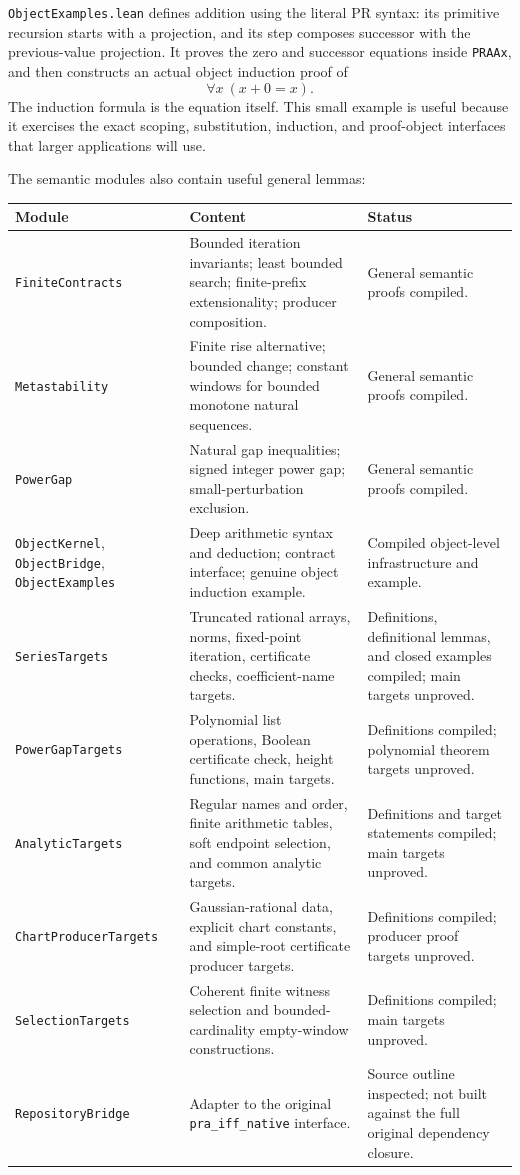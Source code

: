 \texttt{ObjectExamples.lean} defines addition using the literal PR syntax:
its primitive recursion starts with a projection, and its step composes
successor with the previous-value projection.  It proves the zero and
successor equations inside \texttt{PRAAx}, and then constructs an actual
object induction proof of
\[
                         \forall x\ (x+0=x).
\]
The induction formula is the equation itself.  This small example is
useful because it exercises the exact scoping, substitution, induction,
and proof-object interfaces that larger applications will use.

The semantic modules also contain useful general lemmas:
\begin{center}\small
\begin{longtable}{@{}P{.27\linewidth}P{.36\linewidth}P{.28\linewidth}@{}}
\toprule
Module & Content & Status\\
\midrule\endhead
\texttt{FiniteContracts} & Bounded iteration invariants; least bounded
search; finite-prefix extensionality; producer composition. & General
semantic proofs compiled.\\
\texttt{Metastability} & Finite rise alternative; bounded change;
constant windows for bounded monotone natural sequences. & General
semantic proofs compiled.\\
\texttt{PowerGap} & Natural gap inequalities; signed integer power gap;
small-perturbation exclusion. & General semantic proofs compiled.\\
\texttt{ObjectKernel}, \texttt{ObjectBridge}, \texttt{ObjectExamples}
& Deep arithmetic syntax and deduction; contract interface; genuine
object induction example. & Compiled object-level infrastructure and
example.\\
\texttt{SeriesTargets} & Truncated rational arrays, norms, fixed-point
iteration, certificate checks, coefficient-name targets. & Definitions,
definitional lemmas, and closed examples compiled; main targets unproved.\\
\texttt{PowerGapTargets} & Polynomial list operations, Boolean certificate
check, height functions, main targets. & Definitions compiled; polynomial
theorem targets unproved.\\
\texttt{AnalyticTargets} & Regular names and order, finite arithmetic
tables, soft endpoint selection, and common analytic targets. & Definitions
and target statements compiled; main targets unproved.\\
\texttt{ChartProducerTargets} & Gaussian-rational data, explicit chart
constants, and simple-root certificate producer targets. & Definitions
compiled; producer proof targets unproved.\\
\texttt{SelectionTargets} & Coherent finite witness selection and
bounded-cardinality empty-window constructions. & Definitions compiled;
main targets unproved.\\
\texttt{RepositoryBridge} & Adapter to the original
\texttt{pra\_iff\_native} interface. & Source outline inspected; not built
against the full original dependency closure.\\
\bottomrule
\end{longtable}
\end{center}

